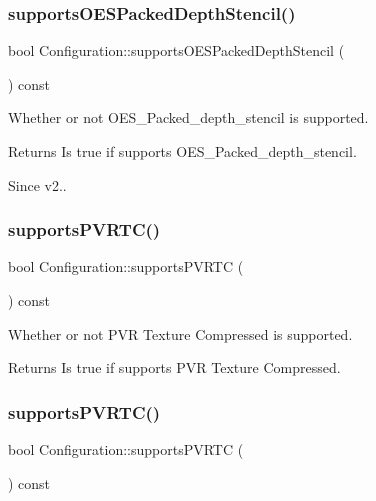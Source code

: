 \subsubsection{\texorpdfstring{supports\+O\+E\+S\+Packed\+Depth\+Stencil()}{supportsOESPackedDepthStencil()}\hspace{0.1cm}{\footnotesize\ttfamily [2/2]}}
{\footnotesize\ttfamily bool Configuration\+::supports\+O\+E\+S\+Packed\+Depth\+Stencil (\begin{DoxyParamCaption}{ }\end{DoxyParamCaption}) const}

Whether or not O\+E\+S\+\_\+\+Packed\+\_\+depth\+\_\+stencil is supported.

\begin{DoxyReturn}{Returns}
Is true if supports O\+E\+S\+\_\+\+Packed\+\_\+depth\+\_\+stencil. 
\end{DoxyReturn}
\begin{DoxySince}{Since}
v2.. 
\end{DoxySince}
\mbox{\label{classConfiguration_a58248f2265a92b786058241241cbef1d}} 
\subsubsection{\texorpdfstring{supports\+P\+V\+R\+T\+C()}{supportsPVRTC()}\hspace{0.1cm}{\footnotesize\ttfamily [1/2]}}
{\footnotesize\ttfamily bool Configuration\+::supports\+P\+V\+R\+TC (\begin{DoxyParamCaption}{ }\end{DoxyParamCaption}) const}

Whether or not P\+VR Texture Compressed is supported.

\begin{DoxyReturn}{Returns}
Is true if supports P\+VR Texture Compressed. 
\end{DoxyReturn}
\mbox{\label{classConfiguration_a58248f2265a92b786058241241cbef1d}} 
\subsubsection{\texorpdfstring{supports\+P\+V\+R\+T\+C()}{supportsPVRTC()}\hspace{0.1cm}{\footnotesize\ttfamily [2/2]}}
{\footnotesize\ttfamily bool Configuration\+::supports\+P\+V\+R\+TC (\begin{DoxyParamCaption}{ }\end{DoxyParamCaption}) const}

